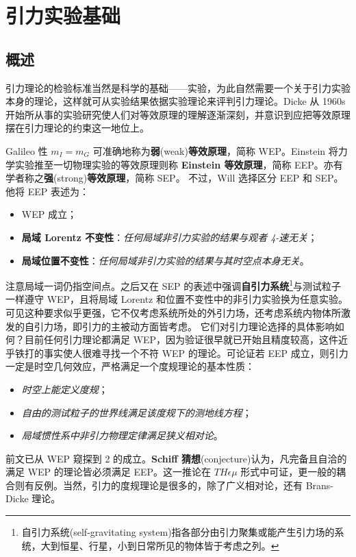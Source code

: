 \chapter{引力实验基础}%

\section{概述}\label{sec:eq-prin}

引力理论的检验标准当然是科学的基础——实验，为此自然需要一个关于引力实验本身的理论，这样就可从实验结果依据实验理论来评判引力理论。Dicke 从 1960s 开始所从事的实验研究使人们对等效原理的理解逐渐深刻，并意识到应把等效原理摆在引力理论的约束这一地位上。

Galileo 性 $m_I=m_G$ 可准确地称为\textbf{弱}(weak)\textbf{等效原理}，简称 WEP。Einstein 将力学实验推至一切物理实验的等效原理则称 \textbf{Einstein 等效原理}，简称 EEP。亦有学者称之\textbf{强}(strong)\textbf{等效原理}，简称 SEP。
不过，Will\cite{Will18} 选择区分 EEP 和 SEP。
他将 EEP 表述为：
\begin{itemize}
    \item WEP 成立；
    \item \textbf{局域 Lorentz 不变性}：\emph{任何局域非引力实验的结果与观者 4-速无关}；
    \item \textbf{局域位置不变性}：\emph{任何局域非引力实验的结果与其时空点本身无关}。
\end{itemize}
注意局域一词仍指空间点。之后又在 SEP 的表述中强调\textbf{自引力系统}\footnote{自引力系统(self-gravitating system)指各部分由引力聚集或能产生引力场的系统，大到恒星、行星，小到日常所见的物体皆于考虑之列。}与测试粒子一样遵守 WEP，且将局域 Lorentz 和位置不变性中的非引力实验换为任意实验。可见这种要求似乎更强，它不仅考虑系统所处的外引力场，还考虑系统内物体所激发的自引力场，即引力的主被动方面皆考虑。
它们对引力理论选择的具体影响如何？目前任何引力理论都满足 WEP，因为验证很早就已开始且精度较高，这件近乎铁打的事实使人很难寻找一个不符 WEP 的理论。可论证若 EEP 成立，则引力一定是时空几何效应，严格满足一个度规理论的基本性质：
\begin{itemize}
    \item \emph{时空上能定义度规}；
    \item \emph{自由的测试粒子的世界线满足该度规下的测地线方程}；
    \item \emph{局域惯性系中非引力物理定律满足狭义相对论}。
\end{itemize}
前文已从 WEP 窥探到 2 的成立。\textbf{Schiff 猜想}(conjecture)认为，凡完备且自洽的满足 WEP 的理论皆必须满足 EEP。这一推论在 $TH\epsilon\mu$ 形式中可证，更一般的耦合则有反例。当然，引力的度规理论是很多的，除了广义相对论，还有 Brans-Dicke 理论。

